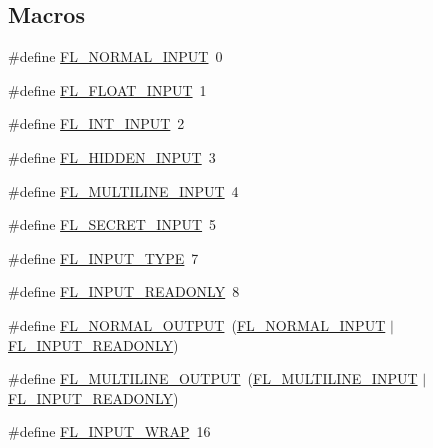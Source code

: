 \subsection*{Macros}
\begin{DoxyCompactItemize}
\item 
\#define \hyperlink{_fl___input___8_h_a84ca5b42ea2a957201958a92fb3f63fe}{F\+L\+\_\+\+N\+O\+R\+M\+A\+L\+\_\+\+I\+N\+P\+UT}~0
\item 
\#define \hyperlink{_fl___input___8_h_a0a167f1c5c15a35af88fa997e84d1c85}{F\+L\+\_\+\+F\+L\+O\+A\+T\+\_\+\+I\+N\+P\+UT}~1
\item 
\#define \hyperlink{_fl___input___8_h_aa8e183014d9b4e5f70734c1136d22346}{F\+L\+\_\+\+I\+N\+T\+\_\+\+I\+N\+P\+UT}~2
\item 
\#define \hyperlink{_fl___input___8_h_a3c6c6190accbcfecb28e53426fafd1b5}{F\+L\+\_\+\+H\+I\+D\+D\+E\+N\+\_\+\+I\+N\+P\+UT}~3
\item 
\#define \hyperlink{_fl___input___8_h_a2ed63532f4c72ef6b90e256f46cdbe28}{F\+L\+\_\+\+M\+U\+L\+T\+I\+L\+I\+N\+E\+\_\+\+I\+N\+P\+UT}~4
\item 
\#define \hyperlink{_fl___input___8_h_a0d1c0c416be4eb9f987fc668c5e62a7f}{F\+L\+\_\+\+S\+E\+C\+R\+E\+T\+\_\+\+I\+N\+P\+UT}~5
\item 
\#define \hyperlink{_fl___input___8_h_ab139223b0e187e39bcc53081e8f35ffa}{F\+L\+\_\+\+I\+N\+P\+U\+T\+\_\+\+T\+Y\+PE}~7
\item 
\#define \hyperlink{_fl___input___8_h_a351f637977c53f1ba249f97f2b0a1c23}{F\+L\+\_\+\+I\+N\+P\+U\+T\+\_\+\+R\+E\+A\+D\+O\+N\+LY}~8
\item 
\#define \hyperlink{_fl___input___8_h_abb1d76455735349c38be5dbe50b4db4f}{F\+L\+\_\+\+N\+O\+R\+M\+A\+L\+\_\+\+O\+U\+T\+P\+UT}~(\hyperlink{_fl___input___8_h_a84ca5b42ea2a957201958a92fb3f63fe}{F\+L\+\_\+\+N\+O\+R\+M\+A\+L\+\_\+\+I\+N\+P\+UT} $\vert$ \hyperlink{_fl___input___8_h_a351f637977c53f1ba249f97f2b0a1c23}{F\+L\+\_\+\+I\+N\+P\+U\+T\+\_\+\+R\+E\+A\+D\+O\+N\+LY})
\item 
\#define \hyperlink{_fl___input___8_h_aa8ef8e7bbf0662e68920a70a0562b0a5}{F\+L\+\_\+\+M\+U\+L\+T\+I\+L\+I\+N\+E\+\_\+\+O\+U\+T\+P\+UT}~(\hyperlink{_fl___input___8_h_a2ed63532f4c72ef6b90e256f46cdbe28}{F\+L\+\_\+\+M\+U\+L\+T\+I\+L\+I\+N\+E\+\_\+\+I\+N\+P\+UT} $\vert$ \hyperlink{_fl___input___8_h_a351f637977c53f1ba249f97f2b0a1c23}{F\+L\+\_\+\+I\+N\+P\+U\+T\+\_\+\+R\+E\+A\+D\+O\+N\+LY})
\item 
\#define \hyperlink{_fl___input___8_h_a570188ba3b53678cf16054330c7cf8f5}{F\+L\+\_\+\+I\+N\+P\+U\+T\+\_\+\+W\+R\+AP}~16

\end{DoxyCompactItemize}
